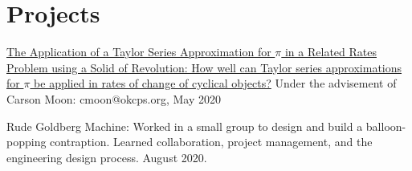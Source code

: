 \documentclass[12pt]{article}
\begin{document}
%

\section*{Projects}
\href{https://github.com/tttnguyen729/ee}{The Application of a Taylor Series Approximation for \(\pi\) in a Related Rates Problem using a Solid of Revolution: How well can Taylor series approximations for \(\pi\) be applied in rates of change of cyclical objects?} Under the advisement of Carson Moon: cmoon@okcps.org, May 2020 

Rude Goldberg Machine: Worked in a small group to design and build a balloon-popping contraption. Learned collaboration, project management, and the engineering design process. August 2020.


\end{document}

